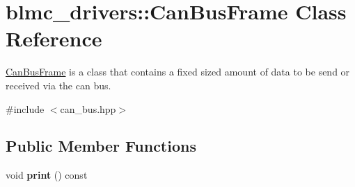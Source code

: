 \hypertarget{classblmc__drivers_1_1CanBusFrame}{}\section{blmc\+\_\+drivers\+:\+:Can\+Bus\+Frame Class Reference}
\label{classblmc__drivers_1_1CanBusFrame}


\hyperlink{classblmc__drivers_1_1CanBusFrame}{Can\+Bus\+Frame} is a class that contains a fixed sized amount of data to be send or received via the can bus.  




{\ttfamily \#include $<$can\+\_\+bus.\+hpp$>$}

\subsection*{Public Member Functions}
\begin{DoxyCompactItemize}
\item 
void {\bfseries print} () const \hypertarget{classblmc__drivers_1_1CanBusFrame_abac5531325f1c6f7bfc2599703208869}{}\label{classblmc__drivers_1_1CanBusFrame_abac5531325f1c6f7bfc2599703208869}

\end{DoxyCompactItemize}
